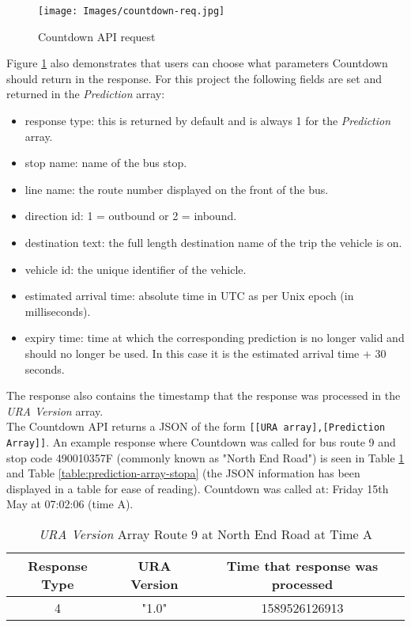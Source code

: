 \begin{figure}[H]
\begin{center}
    \texttt{[image: Images/countdown-req.jpg]}
    \caption{Countdown API request}
    \label{fig:countdown-req}
\end{center}
\end{figure}

Figure \ref{fig:countdown-req} also demonstrates that users can choose what parameters Countdown should return in the response. For this project the following fields are set and returned in the \textit{Prediction} array: 
\begin{itemize}
    \item response type: this is returned by default and is always 1 for the \textit{Prediction} array.
    \item stop name: name of the bus stop.
    \item line name: the route number displayed on the front of the bus.
    \item direction id: 1 = outbound or 2 = inbound.
    \item destination text: the full length destination name of the trip the vehicle is on.
    \item vehicle id: the unique identifier of the vehicle.
    \item estimated arrival time: absolute time in UTC as per Unix epoch (in milliseconds).
    \item expiry time: time at which the corresponding prediction is no longer valid and should no longer be used. In this case it is the estimated arrival time + 30 seconds. 
\end{itemize}
The response also contains the timestamp that the response was processed in the \textit{URA Version} array. \\

The Countdown API returns a JSON of the form \texttt{[[URA array],[Prediction Array]]}. An example response where Countdown was called for bus route 9 and stop code 490010357F (commonly known as "North End Road") is seen in Table \ref{table:ura-array-stopa} and Table \ref{table:prediction-array-stopa} (the JSON information has been displayed in a table for ease of reading). Countdown was called at: Friday 15th May at 07:02:06 (time A).

\begin{table}[H]
    \centering
    \begin{tabular}{|c|c|c|}
        \hline
          Response Type & URA Version & Time that response was processed \\
        \hline
           4  & "1.0" & 1589526126913 \\
        \hline
        \end{tabular}
    \caption{\textit{URA Version} Array Route 9 at North End Road at Time A}
    \label{table:ura-array-stopa}
\end{table}

